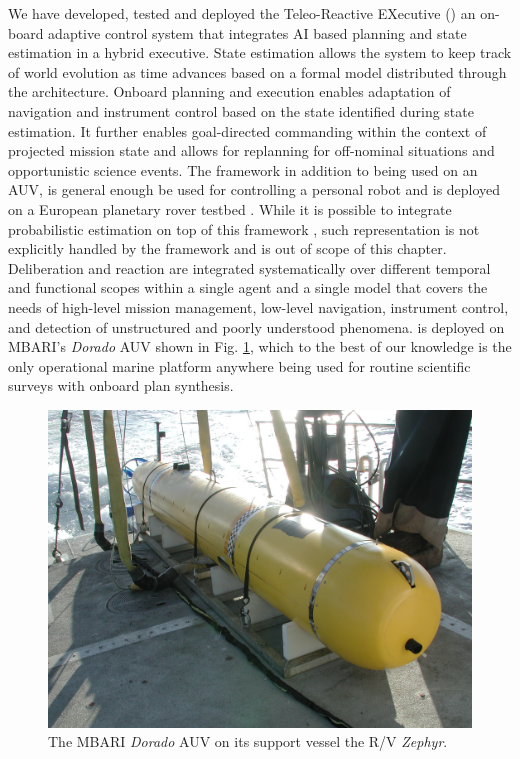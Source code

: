 We have developed, tested and deployed the Teleo-Reactive EXecutive
(\rx) an on-board adaptive control system that integrates AI based
planning and state estimation in a hybrid
executive\cite{mcgann08a,mcgann08b,py10}.  State estimation allows the
system to keep track of world evolution as time advances based on a
formal model distributed through the architecture.  Onboard planning
and execution enables adaptation of navigation and instrument control
based on the state identified during state estimation.  It further
enables goal-directed commanding within the context of projected
mission state and allows for replanning for off-nominal situations and
opportunistic science events. The framework in addition to being used
on an AUV, is general enough be used for controlling a personal robot
\cite{pr2,Meeussen:2010dn,mcgann2009} and is deployed on a European
planetary rover testbed \cite{goac11}. While it is possible to
integrate probabilistic estimation on top of this framework
\cite{mcgann08d}, such representation is not explicitly handled by the
framework and is out of scope of this chapter.  Deliberation and
reaction are integrated systematically over different temporal and
functional scopes within a single agent and a single model that covers
the needs of high-level mission management, low-level navigation,
instrument control, and detection of unstructured and poorly
understood phenomena. \rx is deployed on MBARI's \emph{Dorado} AUV
shown in Fig. \ref{fig:auv-fig}, which to the best of our knowledge is
the only operational marine platform anywhere being used for routine
scientific surveys with onboard plan synthesis.

\begin{figure}[t]
  \centering \vskip-5pt
  \includegraphics[scale=0.1]{figs/MBARI-AUV.jpg}
  \caption{\small The MBARI \emph{Dorado} AUV on its support vessel
    the R/V \emph{Zephyr}.}
  \label{fig:auv-fig}
  \vskip-0.3cm
\end{figure}

